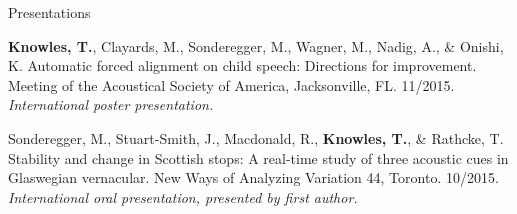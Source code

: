 \documentclass{resume} %
\begin{document}
\begin{rSection}{Presentations}
\begin{etaremune}
\item {\bf Knowles, T.}, Clayards, M., Sonderegger, M., Wagner, M., Nadig, A., \& Onishi, K. Automatic forced alignment on child speech: Directions for improvement. Meeting of the Acoustical Society of America, Jacksonville, FL. 11/2015. \emph{International poster presentation.}
	
%	
%	
%	
	
\item Sonderegger, M., Stuart-Smith, J., Macdonald, R., {\bf Knowles, T.}, \& Rathcke, T. Stability and change in Scottish stops: A real-time study of three acoustic cues in Glaswegian vernacular. New Ways of Analyzing Variation 44, Toronto. 10/2015. \emph{International oral presentation, presented by first author.}
	

\end{etaremune}
\end{rSection}
\end{document}
